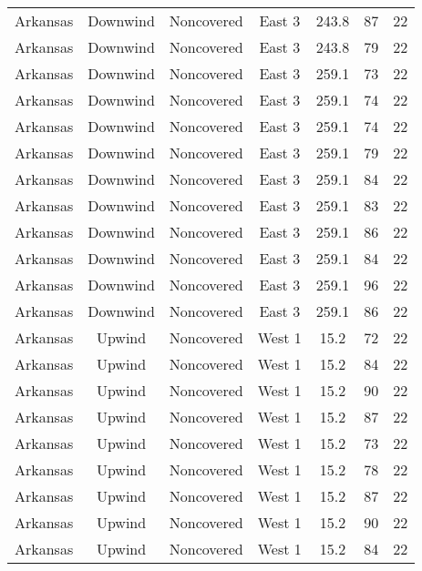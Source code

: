 \documentclass{article}
\begin{document}
\begin{longtable}[H]{ccccccc}
Arkansas & Downwind  & Noncovered & East 3        & 243.8        & 87          & 22  \\
Arkansas & Downwind  & Noncovered & East 3        & 243.8        & 79          & 22  \\
Arkansas & Downwind  & Noncovered & East 3        & 259.1        & 73          & 22  \\
Arkansas & Downwind  & Noncovered & East 3        & 259.1        & 74          & 22  \\
Arkansas & Downwind  & Noncovered & East 3        & 259.1        & 74          & 22  \\
Arkansas & Downwind  & Noncovered & East 3        & 259.1        & 79          & 22  \\
Arkansas & Downwind  & Noncovered & East 3        & 259.1        & 84          & 22  \\
Arkansas & Downwind  & Noncovered & East 3        & 259.1        & 83          & 22  \\
Arkansas & Downwind  & Noncovered & East 3        & 259.1        & 86          & 22  \\
Arkansas & Downwind  & Noncovered & East 3        & 259.1        & 84          & 22  \\
Arkansas & Downwind  & Noncovered & East 3        & 259.1        & 96          & 22  \\
Arkansas & Downwind  & Noncovered & East 3        & 259.1        & 86          & 22  \\
Arkansas & Upwind    & Noncovered & West 1        & 15.2         & 72          & 22  \\
Arkansas & Upwind    & Noncovered & West 1        & 15.2         & 84          & 22  \\
Arkansas & Upwind    & Noncovered & West 1        & 15.2         & 90          & 22  \\
Arkansas & Upwind    & Noncovered & West 1        & 15.2         & 87          & 22  \\
Arkansas & Upwind    & Noncovered & West 1        & 15.2         & 73          & 22  \\
Arkansas & Upwind    & Noncovered & West 1        & 15.2         & 78          & 22  \\
Arkansas & Upwind    & Noncovered & West 1        & 15.2         & 87          & 22  \\
Arkansas & Upwind    & Noncovered & West 1        & 15.2         & 90          & 22  \\
Arkansas & Upwind    & Noncovered & West 1        & 15.2         & 84          & 22  \\

\end{longtable}
\end{document}
